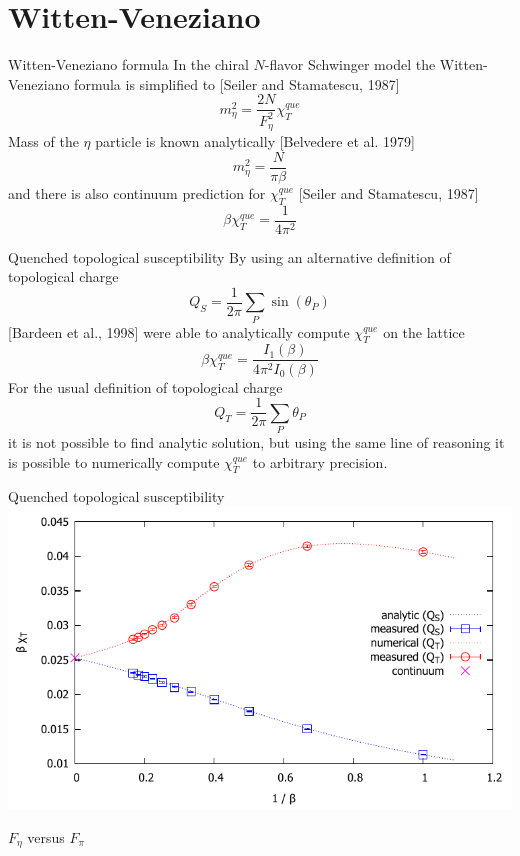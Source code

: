\documentclass[english]{beamer}
\begin{document}
\section{Witten-Veneziano}

\begin{frame}{Witten-Veneziano formula}
In the chiral $N$-flavor Schwinger model the Witten-Veneziano formula is simplified to [Seiler and
Stamatescu, 1987]
\[
  m_\eta^2 = \frac{2N}{F_\eta^2}\chi_T^{que}
\]
Mass of the $\eta$ particle is known analytically [Belvedere et al. 1979] 
\[
  m_\eta^2 = \frac{N}{\pi\beta}
\]
and there is also continuum prediction for $\chi_T^{que}$
[Seiler and Stamatescu, 1987]
\[
  \beta\chi_T^{que} = \frac{1}{4\pi^2}
\]
\end{frame}

\begin{frame}{Quenched topological susceptibility}
By using an alternative definition of topological charge
\[
  Q_S = \frac{1}{2\pi}\sum_{P}\sin(\theta_P)
\]
[Bardeen et al., 1998] were able to analytically compute
$\chi_T^{que}$ on the lattice
\[
  \beta\chi_T^{que} = \frac{I_1(\beta)}{4 \pi^2 I_0(\beta)}
\]
For the usual definition of topological charge
\[
  Q_T = \frac{1}{2\pi}\sum_{P}\theta_P
\]
it is not possible to find analytic solution, but using the 
same line of reasoning it is possible to numerically compute
$\chi_T^{que}$ to arbitrary precision.
\end{frame}

\begin{frame}{Quenched topological susceptibility}
  \includegraphics[width=1\textwidth]{figs/BeakDiagram}
\end{frame}

\begin{frame}{$F_\eta$ versus $F_\pi$}
\end{frame}
\end{document}
